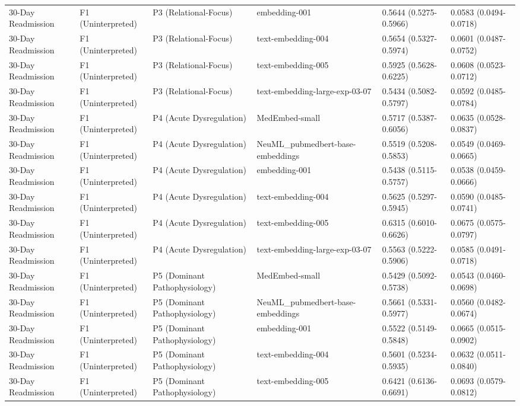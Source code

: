 \documentclass[border=0pt]{standalone}
\begin{document}
\begin{adjustbox}{width=\textwidth}
\begin{tabular}{llllll}
30-Day Readmission & F1 (Uninterpreted) & P3 (Relational-Focus) & embedding-001 & 0.5644 (0.5275-0.5966) & 0.0583 (0.0494-0.0718) \\
30-Day Readmission & F1 (Uninterpreted) & P3 (Relational-Focus) & text-embedding-004 & 0.5654 (0.5327-0.5974) & 0.0601 (0.0487-0.0752) \\
30-Day Readmission & F1 (Uninterpreted) & P3 (Relational-Focus) & text-embedding-005 & 0.5925 (0.5628-0.6225) & 0.0608 (0.0523-0.0712) \\
30-Day Readmission & F1 (Uninterpreted) & P3 (Relational-Focus) & text-embedding-large-exp-03-07 & 0.5434 (0.5082-0.5797) & 0.0592 (0.0485-0.0784) \\
30-Day Readmission & F1 (Uninterpreted) & P4 (Acute Dysregulation) & MedEmbed-small & 0.5717 (0.5387-0.6056) & 0.0635 (0.0528-0.0837) \\
30-Day Readmission & F1 (Uninterpreted) & P4 (Acute Dysregulation) & NeuML\_pubmedbert-base-embeddings & 0.5519 (0.5208-0.5853) & 0.0549 (0.0469-0.0665) \\
30-Day Readmission & F1 (Uninterpreted) & P4 (Acute Dysregulation) & embedding-001 & 0.5438 (0.5115-0.5757) & 0.0538 (0.0459-0.0666) \\
30-Day Readmission & F1 (Uninterpreted) & P4 (Acute Dysregulation) & text-embedding-004 & 0.5625 (0.5297-0.5945) & 0.0590 (0.0485-0.0741) \\
30-Day Readmission & F1 (Uninterpreted) & P4 (Acute Dysregulation) & text-embedding-005 & 0.6315 (0.6010-0.6626) & 0.0675 (0.0575-0.0797) \\
30-Day Readmission & F1 (Uninterpreted) & P4 (Acute Dysregulation) & text-embedding-large-exp-03-07 & 0.5563 (0.5222-0.5906) & 0.0585 (0.0491-0.0718) \\
30-Day Readmission & F1 (Uninterpreted) & P5 (Dominant Pathophysiology) & MedEmbed-small & 0.5429 (0.5092-0.5738) & 0.0543 (0.0460-0.0698) \\
30-Day Readmission & F1 (Uninterpreted) & P5 (Dominant Pathophysiology) & NeuML\_pubmedbert-base-embeddings & 0.5661 (0.5331-0.5977) & 0.0560 (0.0482-0.0674) \\
30-Day Readmission & F1 (Uninterpreted) & P5 (Dominant Pathophysiology) & embedding-001 & 0.5522 (0.5149-0.5848) & 0.0665 (0.0515-0.0902) \\
30-Day Readmission & F1 (Uninterpreted) & P5 (Dominant Pathophysiology) & text-embedding-004 & 0.5601 (0.5234-0.5935) & 0.0632 (0.0511-0.0840) \\
30-Day Readmission & F1 (Uninterpreted) & P5 (Dominant Pathophysiology) & text-embedding-005 & 0.6421 (0.6136-0.6691) & 0.0693 (0.0579-0.0812) \\

\end{tabular}
\end{adjustbox}
\end{document}
